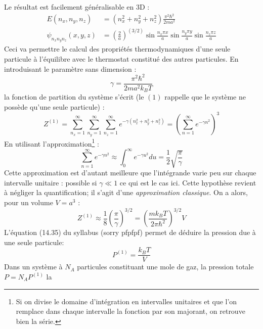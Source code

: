 \documentclass	[11pt, a4paper, openany]{book}
\begin{document}
		Le résultat est facilement généralisable en 3D :
		\begin{equation}
			\begin{array}{ll}
				E(n_x,n_y,n_z)          & = (n_x^2 +n_y^2+n_z^2)\frac{\pi^2\hbar^2}{2ma^2}                                        \\
				\psi_{n_xn_yn_z}(x,y,z) & = (\frac{2}{a})^(3/2)\sin\frac{n_x\pi x}{a}\sin\frac{n_y\pi y}{a}\sin\frac{n_z\pi z}{a} 
			\end{array} 
		\end{equation}
		Ceci va permettre le calcul des propriétés thermodynamiques d'une seule particule à l'équilibre avec
		le thermostat constitué des autres particules. En introduisant le paramètre sans dimension :
		\begin{equation}
			\gamma = \dfrac{\pi^2\hbar^2}{2ma^2k_BT}
		\end{equation} 
		la fonction de partition du système s'écrit (le $(1)$ rappelle que le système ne possède qu'une
		seule particule) :
		\begin{equation}
			Z^{(1)} = \sum_{n_x=1}^\infty\sum_{n_y=1}^\infty\sum_{n_z=1}^\infty e^{-\gamma(n_x^2 +n_y^2+n_z^2)}
			= \left(\sum_{n=1}^\infty e^{-\gamma n^2}\right)^3
		\end{equation}
		En utilisant l'approximation\footnote{Si on divise le domaine d'intégration en intervalles unitaires et
		que l'on remplace dans chaque intervalle la fonction par son majorant, on retrouve bien la série.} :
		\begin{equation}
			\sum_{n=1}^\infty e^{-\gamma n^2} \approx \int_0^\infty e^{-\gamma u^2}du = \dfrac{1}{2}\sqrt{\dfrac{\pi}
				{\gamma}}
			\label{eq:ApproxSerie}
		\end{equation}
		Cette approximation est d'autant meilleure que l’intégrande varie peu sur chaque intervalle unitaire :
		possible si $\gamma \ll 1$ ce qui est le cas ici. Cette hypothèse revient à négliger la quantification;
		il s'agit d'une \textit{approximation classique}. On a alors, pour un volume $V=a^3$ :
		\begin{equation}
			Z^{(1)} \approx \dfrac{1}{8}\left(\dfrac{\pi}{\gamma}\right)^{3/2} = \left(\dfrac{mk_BT}{2\pi\hbar^2}
			\right)^{3/2}V
			\label{eq:z1}
		\end{equation}
		L'équation (14.35) du syllabus (sorry pfpfpf) permet de déduire la pression due à une seule particule:
		\begin{equation}
			P^{(1)} = \dfrac{k_BT}{V}
		\end{equation}
		Dans un système à  $N_A$ particules constituant une mole de gaz, la pression totale $P = N_AP^{(1)}$ la
\end{document}
